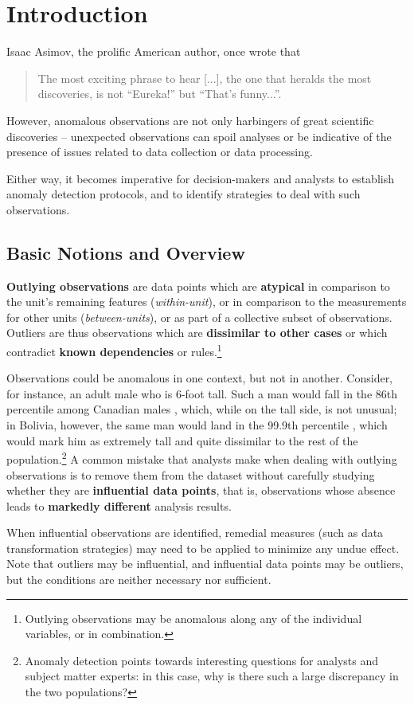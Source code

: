 \newpage\section{Introduction} Isaac Asimov, the prolific American author, once wrote that \begin{quote} The most exciting phrase to hear [...], the one that heralds the most discoveries, is not ``Eureka!'' but ``That's funny...''.\end{quote}
However, anomalous observations are not only harbingers of great scientific discoveries -- unexpected observations can spoil analyses or be indicative of the presence of issues related to data collection or data processing. \par Either way, it becomes imperative for decision-makers and analysts to establish anomaly detection protocols, and to identify strategies to deal with such observations.  
\subsection{Basic Notions and Overview}
\textbf{Outlying observations} are data points which are \textbf{atypical} in comparison to the unit's remaining features (\textit{within-unit}), or in comparison to the measurements for other units (\textit{between-units}), or as part of a collective subset of observations. Outliers are thus observations which are \textbf{dissimilar to other cases} or which contradict \textbf{known dependencies} or rules.\footnote{Outlying observations may be anomalous along any of the individual variables, or in combination.}%
\par Observations could be anomalous in one context, but not in another. Consider, for instance, an adult male who is 6-foot tall. Such a man would fall in the 86th percentile among Canadian males \cite{DP_HPC}, which, while on the tall side, is not unusual; in Bolivia, however, the same man would land in the 99.9th percentile \cite{DP_HPC}, which would mark him as extremely tall and quite dissimilar to the rest of the population.\footnote{Anomaly detection points towards interesting questions for analysts and subject matter experts: in this case, why is there such a large discrepancy in the two populations?}  
\newl
A common mistake that analysts make when dealing with outlying observations is to remove them from the dataset without carefully studying whether they are \textbf{influential data points}, that is, observations whose absence leads to \textbf{markedly different} analysis results.\par When influential observations are identified, remedial measures (such as data transformation strategies) may need to be applied to minimize any undue effect. Note that outliers may be influential, and influential data points may be outliers, but the conditions are neither necessary nor sufficient. 
